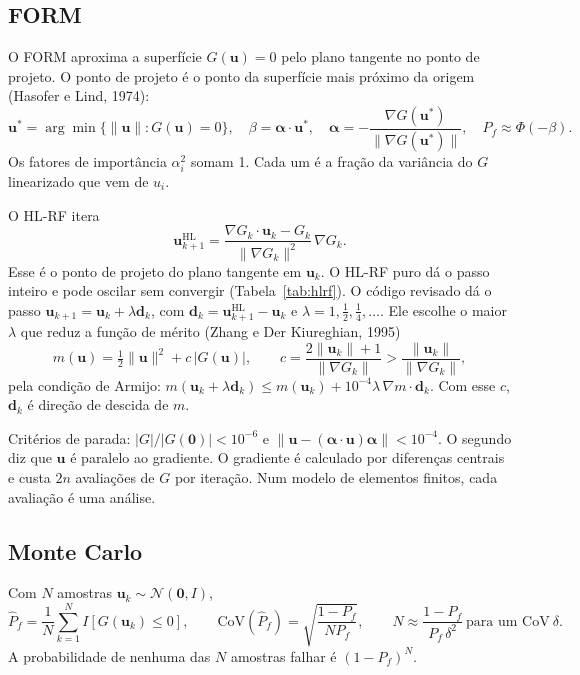 \documentclass[11pt,a4paper]{article}
\newcommand{\cv}{\mathrm{CoV}}
\begin{document}
\subsection{FORM}
\label{sec:form}
O FORM aproxima a superfície $G(\bm u) = 0$ pelo plano tangente no ponto de projeto. O ponto de projeto é o ponto da
superfície mais próximo da origem (Hasofer e Lind, 1974):
\begin{equation}
  \bm u^* = \arg\min \{\|\bm u\| : G(\bm u) = 0\}, \quad \beta = \bm\alpha \cdot \bm u^*, \quad
  \bm\alpha = -\frac{\nabla G(\bm u^*)}{\|\nabla G(\bm u^*)\|}, \quad P_f \approx \Phi(-\beta).
\end{equation}
Os fatores de importância $\alpha_i^2$ somam 1. Cada um é a fração da variância do $G$ linearizado que vem de $u_i$.

O HL-RF itera
\begin{equation}
  \bm u_{k+1}^{\mathrm{HL}} = \frac{\nabla G_k \cdot \bm u_k - G_k}{\|\nabla G_k\|^2}\, \nabla G_k .
\end{equation}
Esse é o ponto de projeto do plano tangente em $\bm u_k$. O HL-RF puro dá o passo inteiro e pode oscilar sem convergir
(Tabela~\ref{tab:hlrf}). O código revisado dá o passo $\bm u_{k+1} = \bm u_k + \lambda \bm d_k$, com
$\bm d_k = \bm u^{\mathrm{HL}}_{k+1} - \bm u_k$ e $\lambda = 1, \tfrac12, \tfrac14, \ldots$. Ele escolhe o maior
$\lambda$ que reduz a função de mérito (Zhang e Der Kiureghian, 1995)
\begin{equation}
  m(\bm u) = \tfrac12 \|\bm u\|^2 + c\, |G(\bm u)|, \qquad c = \frac{2\|\bm u_k\| + 1}{\|\nabla G_k\|}
  > \frac{\|\bm u_k\|}{\|\nabla G_k\|},
\end{equation}
pela condição de Armijo: $m(\bm u_k + \lambda \bm d_k) \leq m(\bm u_k) + 10^{-4} \lambda\, \nabla m \cdot \bm d_k$.
Com esse $c$, $\bm d_k$ é direção de descida de $m$.

Critérios de parada: $|G|/|G(\bm 0)| < 10^{-6}$ e $\|\bm u - (\bm\alpha \cdot \bm u)\bm\alpha\| < 10^{-4}$. O segundo
diz que $\bm u$ é paralelo ao gradiente. O gradiente é calculado por diferenças centrais e custa $2n$ avaliações de $G$
por iteração. Num modelo de elementos finitos, cada avaliação é uma análise.

\subsection{Monte Carlo}
Com $N$ amostras $\bm u_k \sim \mathcal{N}(\bm 0, I)$,
\begin{equation}
  \hat P_f = \frac1N \sum_{k=1}^N I[G(\bm u_k) \leq 0], \qquad
  \cv(\hat P_f) = \sqrt{\frac{1 - P_f}{N P_f}}, \qquad
  N \approx \frac{1 - P_f}{P_f\, \delta^2} \ \text{para um CoV} \ \delta .
\end{equation}
A probabilidade de nenhuma das $N$ amostras falhar é $(1 - P_f)^N$.
\end{document}
